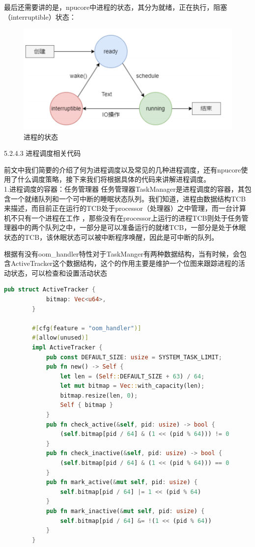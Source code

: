 最后还需要讲的是，npucore中进程的状态，其分为就绪，正在执行，阻塞（interruptible）状态：

\begin{figure}[H]
    \centering
    \caption[short]{进程的状态}
    \includegraphics{figures/05-02-04进程状态.png}
\end{figure}


5.2.4.3 进程调度相关代码

前文中我们简要的介绍了何为进程调度以及常见的几种进程调度，还有npucore使用了什么调度策略，接下来我们将根据具体的代码来讲解进程调度。
\\[5pt]

1.进程调度的容器：任务管理器
任务管理器TaskManager是进程调度的容器，其包含一个就绪队列和一个可中断的睡眠状态队列。我们知道，进程由数据结构TCB来描述，而目前正在运行的TCB处于processor（处理器）之中管理，而一台计算机不只有一个进程在工作 ，那些没有在processor上运行的进程TCB则处于任务管理器中的两个队列之中，一部分是可以准备运行的就绪TCB，一部分是处于休眠状态的TCB，该休眠状态可以被中断程序唤醒，因此是可中断的队列。

根据有没有oom_handler特性对于TaskManger有两种数据结构，当有时候，会包含ActiveTracker这个数据结构，这个的作用主要是维护一个位图来跟踪进程的活动状态，可以检查和设置活动状态

\begin{lstlisting}[language=rust,caption={数据结构ActiveTracker}]
    pub struct ActiveTracker {
            bitmap: Vec<u64>,
        }
        
        #[cfg(feature = "oom_handler")]
        #[allow(unused)]
        impl ActiveTracker {
            pub const DEFAULT_SIZE: usize = SYSTEM_TASK_LIMIT;
            pub fn new() -> Self {
                let len = (Self::DEFAULT_SIZE + 63) / 64;
                let mut bitmap = Vec::with_capacity(len);
                bitmap.resize(len, 0);
                Self { bitmap }
            }
            pub fn check_active(&self, pid: usize) -> bool {
                (self.bitmap[pid / 64] & (1 << (pid % 64))) != 0
            }
            pub fn check_inactive(&self, pid: usize) -> bool {
                (self.bitmap[pid / 64] & (1 << (pid % 64))) == 0
            }
            pub fn mark_active(&mut self, pid: usize) {
                self.bitmap[pid / 64] |= 1 << (pid % 64)
            }
            pub fn mark_inactive(&mut self, pid: usize) {
                self.bitmap[pid / 64] &= !(1 << (pid % 64))
            }
        }

\end{lstlisting}


